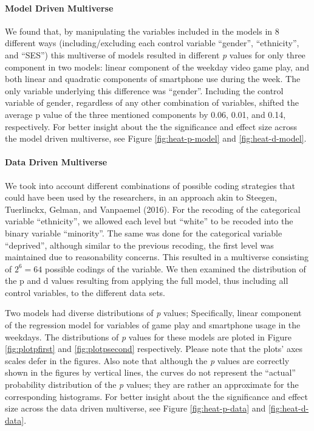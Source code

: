 \documentclass[man]{apa6}
\theoremstyle{definition}
\theoremstyle{definition}
\theoremstyle{definition}
\theoremstyle{remark}
\begin{document}
\hypertarget{model-driven-multiverse}{%
\paragraph{Model Driven Multiverse}\label{model-driven-multiverse}}

We found that, by manipulating the variables included in the models in 8
different ways (including/excluding each control variable
\enquote{gender}, \enquote{ethnicity}, and \enquote{SES}) this
multiverse of models resulted in different \emph{p} values for only
three component in two models: linear component of the weekday video
game play, and both linear and quadratic components of smartphone use
during the week. The only variable underlying this difference was
\enquote{gender}. Including the control variable of gender, regardless
of any other combination of variables, shifted the average p value of
the three mentioned components by 0.06, 0.01, and 0.14, respectively.
For better insight about the the significance and effect size across the
model driven multiverse, see Figure \ref{fig:heat-p-model} and
\ref{fig:heat-d-model}.

\hypertarget{data-driven-multiverse}{%
\paragraph{Data Driven Multiverse}\label{data-driven-multiverse}}

We took into account different combinations of possible coding
strategies that could have been used by the researchers, in an approach
akin to Steegen, Tuerlinckx, Gelman, and Vanpaemel (2016). For the
recoding of the categorical variable \enquote{ethnicity}, we allowed
each level but \enquote{white} to be recoded into the binary variable
\enquote{minority}. The same was done for the categorical variable
\enquote{deprived}, although similar to the previous recoding, the first
level was maintained due to reasonability concerns. This resulted in a
multiverse consisting of \(2^6 = 64\) possible codings of the variable.
We then examined the distribution of the p and d values resulting from
applying the full model, thus including all control variables, to the
different data sets.

Two models had diverse distributions of \emph{p} values; Specifically,
linear component of the regression model for variables of game play and
smartphone usage in the weekdays. The distributions of \emph{p} values
for these models are ploted in Figure \ref{fig:plotpfirst} and
\ref{fig:plotpsecond} respectively. Please note that the plots' axes
scales defer in the figures. Also note that although the \emph{p} values
are correctly shown in the figures by vertical lines, the curves do not
represent the \enquote{actual} probability distribution of the \emph{p}
values; they are rather an approximate for the corresponding histograms.
For better insight about the the significance and effect size across the
data driven multiverse, see Figure \ref{fig:heat-p-data} and
\ref{fig:heat-d-data}.
\end{document}
